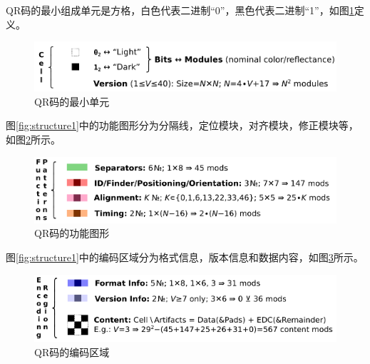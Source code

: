 QR码的最小组成单元是方格，白色代表二进制“0”，黑色代表二进制“1”，如图\ref{fig:structure2}定义。

\begin{figure}[h]
\centering
\includegraphics[width=0.9\linewidth]{structure2}
\caption[cell]{QR码的最小单元}
\label{fig:structure2}
\end{figure}

图\ref{fig:structure1}中的功能图形分为分隔线，定位模块，对齐模块，修正模块等，如图\ref{fig:structure3}所示。

\begin{figure}[h]
\centering
\includegraphics[width=0.9\linewidth]{structure3}
\caption[functional]{QR码的功能图形}
\label{fig:structure3}
\end{figure}

图\ref{fig:structure1}中的编码区域分为格式信息，版本信息和数据内容，如图\ref{fig:structure4}所示。

\begin{figure}[h]
\centering
\includegraphics[width=0.9\linewidth]{structure4}
\caption[content]{QR码的编码区域}
\label{fig:structure4}
\end{figure}

